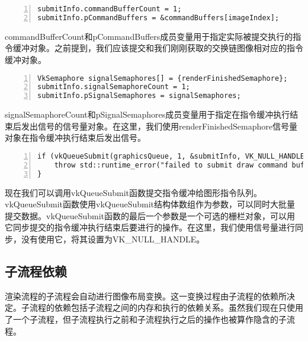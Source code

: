 \documentclass{ctexart}
\begin{document}
\begin{lstlisting}[language={[ANSI]C},keywordstyle=\color{blue!70},commentstyle=\color{red!50!green!50!blue!50},frame=shadowbox, rulesepcolor=\color{red!20!green!20!blue!20},basicstyle=\small,numbers=left, numberstyle=\tiny,breaklines=true]
submitInfo.commandBufferCount = 1;
submitInfo.pCommandBuffers = &commandBuffers[imageIndex];
\end{lstlisting}

commandBufferCount和pCommandBuffers成员变量用于指定实际被提交执行的指令缓冲对象。之前提到，我们应该提交和我们刚刚获取的交换链图像相对应的指令缓冲对象。

\begin{lstlisting}[language={[ANSI]C},keywordstyle=\color{blue!70},commentstyle=\color{red!50!green!50!blue!50},frame=shadowbox, rulesepcolor=\color{red!20!green!20!blue!20},basicstyle=\small,numbers=left, numberstyle=\tiny,breaklines=true]
VkSemaphore signalSemaphores[] = {renderFinishedSemaphore};
submitInfo.signalSemaphoreCount = 1;
submitInfo.pSignalSemaphores = signalSemaphores;
\end{lstlisting}

signalSemaphoreCount和pSignalSemaphores成员变量用于指定在指令缓冲执行结束后发出信号的信号量对象。在这里，我们使用renderFinishedSemaphore信号量对象在指令缓冲执行结束后发出信号。

\begin{lstlisting}[language={[ANSI]C},keywordstyle=\color{blue!70},commentstyle=\color{red!50!green!50!blue!50},frame=shadowbox, rulesepcolor=\color{red!20!green!20!blue!20},basicstyle=\small,numbers=left, numberstyle=\tiny,breaklines=true]
if (vkQueueSubmit(graphicsQueue, 1, &submitInfo, VK_NULL_HANDLE) != VK_SUCCESS) {
	throw std::runtime_error("failed to submit draw command buffer!");
}
\end{lstlisting}

现在我们可以调用vkQueueSubmit函数提交指令缓冲给图形指令队列。vkQueueSubmit函数使用vkQueueSubmit结构体数组作为参数，可以同时大批量提交数据。vkQueueSubmit函数的最后一个参数是一个可选的栅栏对象，可以用它同步提交的指令缓冲执行结束后要进行的操作。在这里，我们使用信号量进行同步，没有使用它，将其设置为VK\_NULL\_HANDLE。

\subsection{子流程依赖}

渲染流程的子流程会自动进行图像布局变换。这一变换过程由子流程的依赖所决定。子流程的依赖包括子流程之间的内存和执行的依赖关系。虽然我们现在只使用了一个子流程，但子流程执行之前和子流程执行之后的操作也被算作隐含的子流程。
\end{document}
